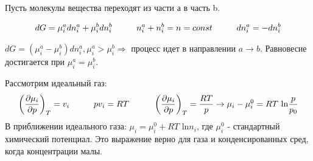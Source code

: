 \begin{lecture}
\begin{lecSection}[Пример]
	\par Пусть молекулы вещества переходят из части а в часть b. 
	
	\begin{equation}	
	\begin{aligned}
	dG = \mu^a_idn^a_i + \mu^b_idn^b_i \hspace*{1cm} n^a_i+n^b_i = n = const \hspace*{1cm} dn^a_i = -dn^b_i
	\end{aligned}
	\end{equation}
	
	$dG = (\mu^a_i - \mu^b_i) dn^a_i, \mu^a_i > \mu^b_i \Rightarrow $ процесс идет в направлении $a \rightarrow b$. Равновесие достигается при $\mu^a_i = \mu^b_i$.
	\par Рассмотрим идеальный газ:
	\begin{equation}	
	\begin{aligned}
	\left(\dfrac{\partial \mu_i}{\partial p}\right)_T = v_i \hspace*{1cm} pv_i = RT \hspace*{1cm} \left(\dfrac{\partial \mu_i}{\partial p}\right)_T = \frac{RT}{p} \rightarrow \mu_i - \mu_i^0 = RT \text{ ln} \frac{p}{p_0} 
	\end{aligned}
	\end{equation}
	В приближении идеального газа: $\mu_i = \mu_i^0 + RT \text{ ln} n_i$, где $\mu_i^0$ - стандартный химический потенциал. Это выражение верно для газа и конденсированных сред, когда концентрации малы.
\end{lecSection}

	
\end{lecture}
